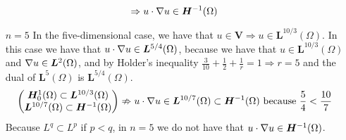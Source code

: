 \begin{itemize}
\[              \Rightarrow u \cdot \nabla u \in \bm{H}^{-1}(\Omega)
          \]
    \item[\(n = 5\)] In the five-dimensional case, we have that \(u \in \bm{V} \Rightarrow u \in \bm{L}^{10/3}(\Omega)\). In this case we have that \(u \cdot \nabla u \in \bm{L}^{5/4}(\Omega)\), because we have that \(u \in \bm{L}^{10/3}(\Omega)\) and \(\nabla u \in \bm{L}^2(\Omega)\), and by Holder's inequality \(\frac{3}{10} + \frac{1}{2} + \frac{1}{r} = 1 \Rightarrow r = 5\) and the dual of \(\bm{L}^{5}(\Omega)\) is \(\bm{L}^{5/4}(\Omega)\).
          \[
              \begin{pmatrix*}
                  \bm{H}^1_0(\Omega) \subset \bm{L}^{10/3}{(\Omega)}  \\
                  \bm{L}^{10/7}(\Omega) \subset \bm{H}^{-1}(\Omega)
              \end{pmatrix*}
              \nRightarrow u \cdot \grad u \in \bm{L}^{10/7}(\Omega) \subset \bm{H}^{-1}(\Omega) \text{ because } \frac{5}{4} < \frac{10}{7}
          \]
          Because \(L^q \subset L^p\) if \(p < q\), in \(n = 5\) we do not have that \(u
          \cdot \nabla u \in \bm{H}^{-1}(\Omega)\).
\end{itemize}

\newpage
